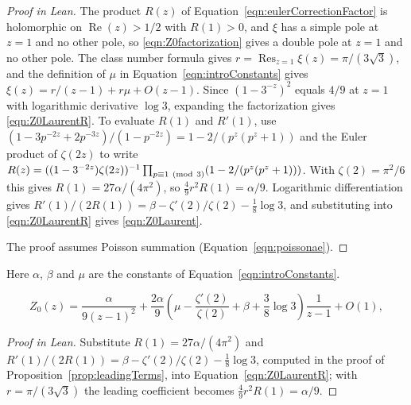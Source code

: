 \begin{proof}[Proof in Lean]

\leanok


The product $R(z)$ of Equation~\ref{eqn:eulerCorrectionFactor} is holomorphic on $\operatorname{Re}(z)>1/2$ with $R(1)>0$, and $\xi$ has a simple pole at $z=1$ and no other pole, so \eqref{eqn:Z0factorization} gives a double pole at $z=1$ and no other pole. The class number formula gives $r=\operatorname{Res}_{z=1}\xi(z)=\pi/(3\sqrt3)$, and the definition of $\mu$ in Equation~\ref{eqn:introConstants} gives $\xi(z)=r/(z-1)+r\mu+O(z-1)$. Since $(1-3^{-z})^2$ equals $4/9$ at $z=1$ with logarithmic derivative $\log3$, expanding the factorization gives \eqref{eqn:Z0LaurentR}. To evaluate $R(1)$ and $R'(1)$, use $(1-3p^{-2z}+2p^{-3z})/(1-p^{-2z})=1-2/(p^z(p^z+1))$ and the Euler product of $\zeta(2z)$ to write $R(z)=((1-3^{-2z})\zeta(2z))^{-1}\prod_{p\equiv1\ (\mathrm{mod}\ 3)}(1-2/(p^z(p^z+1)))$. With $\zeta(2)=\pi^2/6$ this gives $R(1)=27\alpha/(4\pi^2)$, so $\tfrac49r^2R(1)=\alpha/9$. Logarithmic differentiation gives $R'(1)/(2R(1))=\beta-\zeta'(2)/\zeta(2)-\tfrac18\log3$, and substituting into \eqref{eqn:Z0LaurentR} gives \eqref{eqn:Z0Laurent}.

The proof assumes Poisson summation (Equation~\ref{eqn:poissonae}).

\end{proof}

\begin{equationnode}

\label{eqn:Z0Laurent}


\leanok

Here $\alpha$, $\beta$ and $\mu$ are the constants of Equation~\ref{eqn:introConstants}.

\begin{equation*} Z_0(z)=\frac{\alpha}{9(z-1)^2} +\frac{2\alpha}{9}\left(\mu-\frac{\zeta'(2)}{\zeta(2)}+\beta +\frac38\log3\right)\frac{1}{z-1}+O(1), \end{equation*}

\end{equationnode}

\begin{proof}[Proof in Lean]

\leanok


Substitute $R(1)=27\alpha/(4\pi^2)$ and $R'(1)/(2R(1))=\beta-\zeta'(2)/\zeta(2)-\tfrac18\log3$, computed in the proof of Proposition~\ref{prop:leadingTerms}, into Equation~\ref{eqn:Z0LaurentR}; with $r=\pi/(3\sqrt3)$ the leading coefficient becomes $\tfrac49r^2R(1)=\alpha/9$.

\end{proof}

